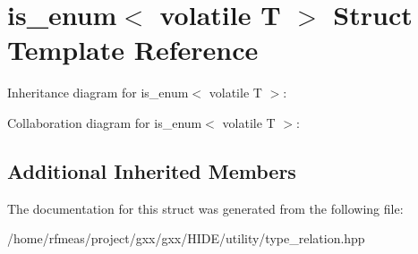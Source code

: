 \hypertarget{structis__enum_3_01volatile_01T_01_4}{}\section{is\+\_\+enum$<$ volatile T $>$ Struct Template Reference}
\label{structis__enum_3_01volatile_01T_01_4}


Inheritance diagram for is\+\_\+enum$<$ volatile T $>$\+:


Collaboration diagram for is\+\_\+enum$<$ volatile T $>$\+:
\subsection*{Additional Inherited Members}


The documentation for this struct was generated from the following file\+:\begin{DoxyCompactItemize}
\item 
/home/rfmeas/project/gxx/gxx/\+H\+I\+D\+E/utility/type\+\_\+relation.\+hpp\end{DoxyCompactItemize}
